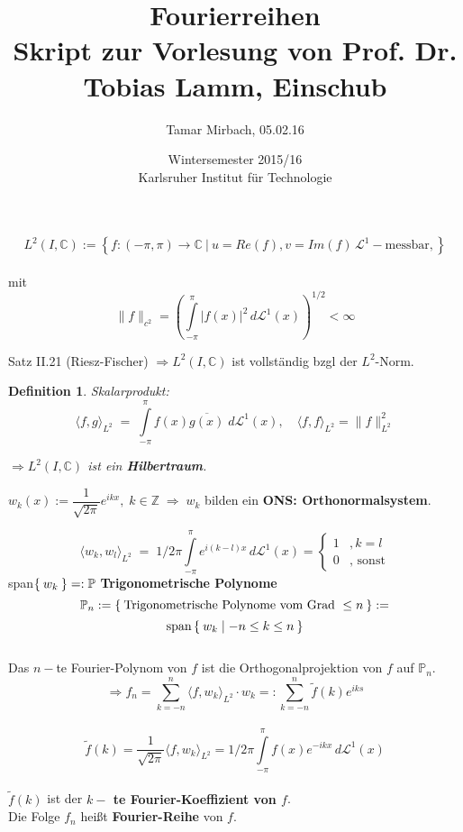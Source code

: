 \documentclass[11pt]{memoir}
\newtheorem{Definition}{Definition}[chapter]
\begin{document}
\title{\textbf{Fourierreihen}\\ Skript zur Vorlesung von Prof. Dr. Tobias Lamm, Einschub}
\author{Tamar Mirbach, 05.02.16}
\date{Wintersemester 2015/16\\ Karlsruher Institut für Technologie}

\maketitle


$$L^2(I, \mathbb C) := \left\{ f: (-\pi, \pi) \rightarrow \mathbb C \ \bigg\vert \ u = Re(f), v = Im(f) \, \mathscr L^1-\text{messbar}, \right\}$$ \\
mit $$ \|f\|_{c^2} = \left( \int\limits_{-\pi}^\pi |f(x)|^2 \, d\mathscr L^1(x) \right)^{1/2} < \infty $$


Satz II.21 (Riesz-Fischer) $\Rightarrow L^2(I, \mathbb C)$ ist vollständig bzgl der $L^2$-Norm.
\begin{Definition}
\emph{Skalarprodukt}: \\
$$\langle f, g\rangle_{L^2}\; = \;\int\limits_{-\pi}^\pi f(x) \overline{g(x)} \; d\mathscr L^1(x), \quad \langle f, f\rangle_{L^2} = \|f\|^2_{L^2}$$

$\Rightarrow L^2(I, \mathbb C)$ ist ein \textbf{Hilbertraum}.
\end{Definition}
$w_k(x) := \dfrac{1}{\sqrt{2\pi}} e^{ikx}, \;k \in \mathbb Z \; \Rightarrow\; w_k$ bilden ein \textbf{ONS: Orthonormalsystem}.
\par
\begin{equation}
\langle w_k, w_l \rangle_{L^2} \;=\; 1/2\pi \int\limits_{-\pi}^\pi e^{i(k-l)x} \, d\mathscr L^1(x) = 
\begin{cases}
	1 & , k=l \\
	0 & \text{, sonst}
\end{cases}
\end{equation}
span$\Set{w_k} =: \mathbb P$ \quad \textbf{Trigonometrische Polynome} \\
$$\mathbb P_n := \Set{\text{Trigonometrische Polynome vom Grad }\leq n} := $$ $$\text{span}\Set{w_k | -n \leq k \leq n}$$ \\
Das $n-$te Fourier-Polynom von $f$ ist die Orthogonalprojektion von $f$ auf $\mathbb P_n$. \\
$$\Rightarrow f_n = \sum\limits_{k=-n}^n \langle f, w_k \rangle_{L^2} \cdotp w_k =: \sum\limits_{k=-n}^n \tilde{f}(k)e^{iks}$$ \\
$$\tilde{f}(k) = \dfrac{1}{\sqrt{2\pi}} \langle f, w_k\rangle_{L^2} = 1/2\pi \int\limits_{-\pi}^\pi f(x) e^{-ikx}\, d\mathscr L^1(x) $$ \\
$\tilde{f}(k)$ ist der \textbf{$k-$ te Fourier-Koeffizient von $f$}. \\
Die Folge $f_n$ heißt \textbf{Fourier-Reihe} von $f$. 
\par\bigskip
\end{document}
